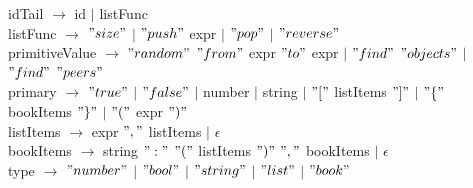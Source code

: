 \documentclass{article}
\begin{document}
idTail $\rightarrow$ id $\vert$ listFunc \\

listFunc $\rightarrow$ $"size"$ $\vert$ $"push"$ expr $\vert$ $"pop"$ $\vert$ $"reverse"$ \\

primitiveValue $\rightarrow$ $"random"$ $"from"$ expr $"to"$ expr $\vert$ $"find"$ $"objects"$ $\vert$ $"find"$ $"peers"$ \\

primary $\rightarrow$ $"true"$ $\vert$ $"false"$ $\vert$ number $\vert$ string $\vert$ $"["$ listItems $"]"$ $\vert$ $"\{"$ bookItems $"\}"$ $\vert$ $"("$ expr $")"$ \\

listItems $\rightarrow$ expr $","$ listItems $\vert$ $\epsilon$ \\

bookItems $\rightarrow$ string $":"$ $"("$ listItems $")"$ $","$ bookItems $\vert$ $\epsilon$ \\

type $\rightarrow$ $"number"$ $\vert$ $"bool"$ $\vert$ $"string"$ $\vert$ $"list"$ $\vert$ $"book"$ \\
\end{document}
